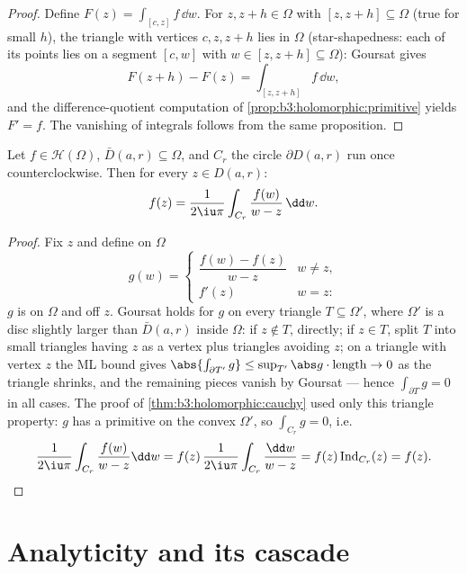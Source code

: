 \begin{proof}
Define $F(z) = \int_{[c,z]}f\,\dd w$. For $z, z + h \in
\Omega$ with $[z, z+h] \subseteq \Omega$ (true for small $h$),
the triangle with vertices $c, z, z+h$ lies in $\Omega$
(star-shapedness: each of its points lies on a segment $[c,
w]$ with $w \in [z, z+h] \subseteq \Omega$): Goursat gives
\[
F(z + h) - F(z) = \int_{[z, z+h]}f\,\dd w,
\]
and the difference-quotient computation of
\cref{prop:b3:holomorphic:primitive} yields $F' = f$. The
vanishing of  integrals follows from the same
proposition.
\end{proof}

\begin{theorem}
\label{thm:b3:holomorphic:formula}
Let $f \in \mathcal H(\Omega)$, $\bar D(a, r) \subseteq
\Omega$, and $C_r$ the circle $\partial D(a,r)$ run once
counterclockwise. Then for every $z \in D(a, r)$:
\[
f(z) = \frac1{2\iu\pi}\int_{C_r}\frac{f(w)}{w - z}\,\dd w .
\]
\end{theorem}

\begin{proof}
Fix $z$ and define on $\Omega$
\[
g(w) = \begin{cases}
\dfrac{f(w) - f(z)}{w - z} & w \neq z,\\[4pt]
f'(z) & w = z :
\end{cases}
\]
$g$ is  on $\Omega$ and  off $z$. Goursat
holds for $g$ on every triangle $T \subseteq \Omega'$, where
$\Omega'$ is a disc slightly larger than $\bar D(a,r)$ inside
$\Omega$: if $z \notin T$, directly; if $z \in T$, split $T$
into small triangles having $z$ as a vertex plus triangles
avoiding $z$; on a triangle with vertex $z$ the ML bound gives
$\abs{\int_{\partial T'}g} \leq \sup_{T'}\abs
g\cdot\operatorname{length} \to 0$ as the triangle shrinks,
and the remaining pieces vanish by Goursat --- hence
$\int_{\partial T}g = 0$ in all cases. The proof of
\cref{thm:b3:holomorphic:cauchy} used only this triangle
property: $g$ has a primitive on the convex $\Omega'$, so
$\int_{C_r}g = 0$, i.e.
\[
\frac1{2\iu\pi}\int_{C_r}\frac{f(w)}{w - z}\dd w
= f(z)\,\frac{1}{2\iu\pi}\int_{C_r}\frac{\dd w}{w - z}
= f(z)\operatorname{Ind}_{C_r}(z) = f(z) .
\]
\end{proof}

\section{Analyticity and its cascade}

